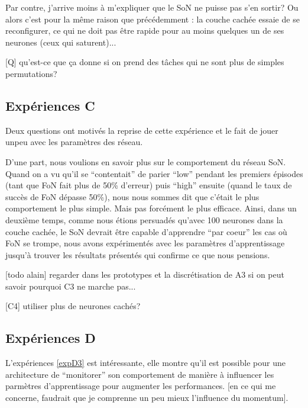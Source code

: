 Par contre, j'arrive moins à m'expliquer que le SoN ne puisse pas s'en sortir? Ou alors c'est pour la même raison que précédemment : la couche cachée essaie de se reconfigurer, ce qui ne doit pas être rapide pour au moins quelques un de ses neurones (ceux qui saturent)...

[Q] qu'est-ce que ça donne si on prend des tâches qui ne sont plus de simples permutations?

\subsection{Expériences C
\label{sec:expC}}

Deux questions ont motivés la reprise de cette expérience et le fait de jouer unpeu avec les paramètres des réseau. 

D'une part, nous voulions en savoir plus sur le comportement du réseau SoN. Quand on a vu qu'il se ``contentait'' de parier ``low'' pendant les premiers épisodes (tant que FoN fait plus de 50\% d'erreur) puis ``high'' ensuite (quand le taux de succès de FoN dépasse 50\%), nous nous sommes dit que c'était le plus comportement le plus simple. Mais pas forcément le plus efficace.
Ainsi, dans un deuxième temps, comme nous étions persuadés qu'avec 100 neurones dans la couche cachée, le SoN devrait être capable d'apprendre ``par coeur'' les cas où FoN se trompe, nous avons expérimentés avec les paramètres d'apprentissage jusqu'à trouver les résultats présentés qui confirme ce que nous pensions.

[todo alain] regarder dans les prototypes et la discrétisation de A3 si on peut savoir pourquoi C3 ne marche pas...

[C4] utiliser plus de neurones cachés?

\subsection{Expériences D
\label{sec:expD}}

L'expériences \ref{expD3} est intéressante, elle montre qu'il est possible pour une architecture de ``monitorer'' son comportement de manière à influencer les parmètres d'apprentissage pour augmenter les performances. [en ce qui me concerne, faudrait que je comprenne un peu mieux l'influence du momentum].

